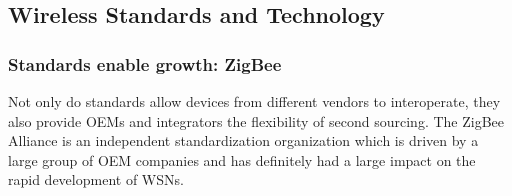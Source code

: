 \subsection{Wireless Standards and Technology}
\subsubsection{Standards enable growth: ZigBee}
Not only do standards allow devices from different vendors to interoperate, they also provide OEMs and integrators the flexibility of second sourcing. The ZigBee Alliance is an independent standardization organization which is driven by a large group of OEM companies and has definitely had a large impact on the rapid development of WSNs.\\

